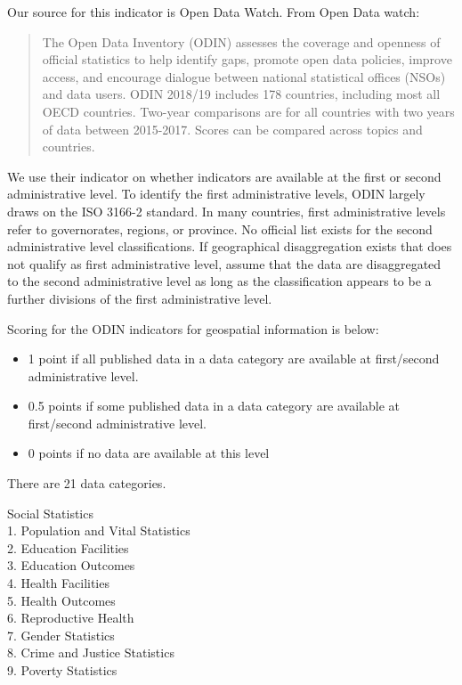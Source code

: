 \documentclass[]{article}
\providecommand{\tightlist}{%
  \setlength{\itemsep}{0pt}\setlength{\parskip}{0pt}}
\begin{document}
Our source for this indicator is Open Data Watch. From Open Data watch:

\begin{quote}
The Open Data Inventory (ODIN) assesses the coverage and openness of
official statistics to help identify gaps, promote open data policies,
improve access, and encourage dialogue between national statistical
offices (NSOs) and data users. ODIN 2018/19 includes 178 countries,
including most all OECD countries. Two-year comparisons are for all
countries with two years of data between 2015-2017. Scores can be
compared across topics and countries.
\end{quote}

We use their indicator on whether indicators are available at the first
or second administrative level. To identify the first administrative
levels, ODIN largely draws on the ISO 3166-2 standard. In many
countries, first administrative levels refer to governorates, regions,
or province. No official list exists for the second administrative level
classifications. If geographical disaggregation exists that does not
qualify as first administrative level, assume that the data are
disaggregated to the second administrative level as long as the
classification appears to be a further divisions of the first
administrative level.

Scoring for the ODIN indicators for geospatial information is below:

\begin{itemize}
\tightlist
\item
  1 point if all published data in a data category are available at
  first/second administrative level.\\
\item
  0.5 points if some published data in a data category are available at
  first/second administrative level.\\
\item
  0 points if no data are available at this level
\end{itemize}

There are 21 data categories.

Social Statistics\\
1. Population and Vital Statistics\\
2. Education Facilities\\
3. Education Outcomes\\
4. Health Facilities\\
5. Health Outcomes\\
6. Reproductive Health\\
7. Gender Statistics\\
8. Crime and Justice Statistics\\
9. Poverty Statistics
\end{document}

